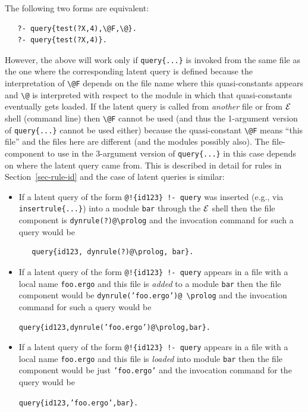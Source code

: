 \documentclass[11pt]{article}
\newcommand{\ERGO}{\mbox{\ensuremath{\cal{E}}\smaller{{\sc{RGO}}}}\xspace}
\newcommand{\FLSYSTEM}{\ERGO}
\newcommand{\ergoext}{ergo\xspace}
\newcommand{\bs}{\textbackslash}
\begin{document}
The following two forms are equivalent:
\begin{verbatim}
   ?- query{test(?X,4),\@F,\@}.
   ?- query{test(?X,4)}.
\end{verbatim}
However, the above will work only if \texttt{query\{...\}} is invoked from
the same file as the one where the corresponding latent query is defined
because the interpretation of \texttt{\bs{}@F} depends on the file name where
this quasi-constants appears and \texttt{\bs{}@} is
interpreted with respect to the module in which that quasi-constants
eventually gets loaded.
If the latent query is called from
\emph{another} file or from \FLSYSTEM shell (command line) then \texttt{\bs{}@F}
cannot be used (and thus the 1-argument version of \texttt{query\{...\}}
cannot be used either) because the quasi-constant
\texttt{\bs{}@F} means ``this file'' and the
files here are different (and the modules possibly also).
The file-component to use in the 3-argument version of
\texttt{query\{...\}} in this case depends on where the latent query came from.
This is described in detail for rules in Section~\ref{sec-rule-id}
and the case of latent queries is similar:
\begin{itemize}
\item  If a latent query of the form \texttt{@!\{id123\} !- query} 
  was inserted (e.g., via \texttt{insertrule\{...\}}) into a module
  \texttt{bar} 
  through the \FLSYSTEM shell then the file component is
  \texttt{dynrule(?)@\bs{}prolog} and the invocation command for such a query
  would be
\begin{verbatim}
   query{id123, dynrule(?)@\prolog, bar}.
\end{verbatim}
\item If a latent query of the form \texttt{@!\{id123\} !- query} appears in
  a file with a local name \texttt{foo.\ergoext} and this file is
  \emph{added} to a module \texttt{bar} then the file component would be
  \texttt{dynrule('foo.\ergoext')@ \bs{}prolog} and the invocation command
  for such a query would be
\begin{alltt}
    query\{id123, dynrule('foo.\ergoext')@\bs{}prolog, bar\}.
\end{alltt}
  \item If a latent query of the form \texttt{@!\{id123\} !- query} appears in
  a file with a local name \texttt{foo.\ergoext} and this file is
  \emph{loaded} into module \texttt{bar} then the file component would be
  just \texttt{'foo.\ergoext'} and the invocation command
  for the query would be
\begin{alltt}
    query\{id123, 'foo.\ergoext', bar\}.
\end{alltt}
\end{itemize}
\end{document}
